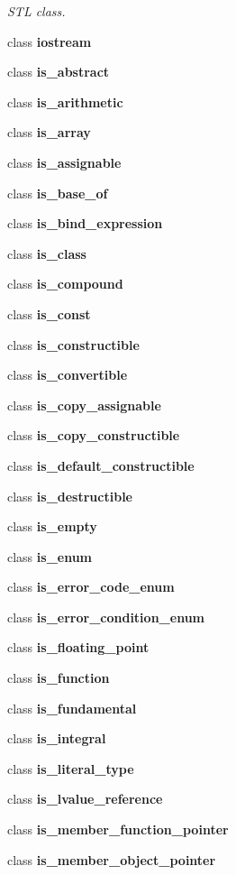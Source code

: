 \begin{DoxyCompactItemize}
\begin{DoxyCompactList}\small\item\em S\+TL class. \end{DoxyCompactList}\item 
class \textbf{ iostream}
\item 
class \textbf{ is\+\_\+abstract}
\item 
class \textbf{ is\+\_\+arithmetic}
\item 
class \textbf{ is\+\_\+array}
\item 
class \textbf{ is\+\_\+assignable}
\item 
class \textbf{ is\+\_\+base\+\_\+of}
\item 
class \textbf{ is\+\_\+bind\+\_\+expression}
\item 
class \textbf{ is\+\_\+class}
\item 
class \textbf{ is\+\_\+compound}
\item 
class \textbf{ is\+\_\+const}
\item 
class \textbf{ is\+\_\+constructible}
\item 
class \textbf{ is\+\_\+convertible}
\item 
class \textbf{ is\+\_\+copy\+\_\+assignable}
\item 
class \textbf{ is\+\_\+copy\+\_\+constructible}
\item 
class \textbf{ is\+\_\+default\+\_\+constructible}
\item 
class \textbf{ is\+\_\+destructible}
\item 
class \textbf{ is\+\_\+empty}
\item 
class \textbf{ is\+\_\+enum}
\item 
class \textbf{ is\+\_\+error\+\_\+code\+\_\+enum}
\item 
class \textbf{ is\+\_\+error\+\_\+condition\+\_\+enum}
\item 
class \textbf{ is\+\_\+floating\+\_\+point}
\item 
class \textbf{ is\+\_\+function}
\item 
class \textbf{ is\+\_\+fundamental}
\item 
class \textbf{ is\+\_\+integral}
\item 
class \textbf{ is\+\_\+literal\+\_\+type}
\item 
class \textbf{ is\+\_\+lvalue\+\_\+reference}
\item 
class \textbf{ is\+\_\+member\+\_\+function\+\_\+pointer}
\item 
class \textbf{ is\+\_\+member\+\_\+object\+\_\+pointer}

\end{DoxyCompactItemize}

